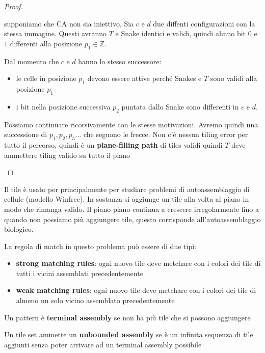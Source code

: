 \begin{teorema}
\begin{proof}
\begin{itemize}
            supponiamo che CA non sia iniettivo, Sia $c$ e $d$
            due diffenti configurazioni con la stessa immagine. Questi 
            avranno $T$ e Snake identici e validi, quindi ahnno bit $0$ e $1$ differenti
            alla posizione $p_1\in \mathbb{Z}$.

            Dal momento che $c$ e $d$ hanno lo stesso successore:
            \begin{itemize}
                \item le celle in posizione $p_1$ devono essere attive perché
                Snakes e $T$ sono validi alla posizione $p_1$
                \item i bit nella posizione successiva $p_2$ puntata dallo Snake
                sono differenti in $c$ e $d$.
            \end{itemize}
            Possiamo continuare ricorsivamente con le stesse motivazioni.
            Avremo quindi una successione di $p_1,p_2,p_3\dots$ che seguono le 
            frecce. Non c'è nessun tiling error per tutto il percorso, quindi 
            è un \textbf{plane-filling path} di tiles validi quindi $T$ deve 
            ammettere tiling valido su tutto il piano
        \end{itemize}
    \end{proof}
\end{teorema}

Il tile è usato per principalmente per studiare problemi di autoassemblaggio di 
cellule (modello Winfree). In sostanza si aggiunge un tile alla volta al piano in modo che rimanga 
valido. Il piano piano continua a crescere irregolarmente fino a quando non possiamo 
più aggiungere tile, questo corrisponde all'autoassemblaggio biologico.

La regola di match in questo problema può essere di due tipi:
\begin{itemize}
    \item \textbf{strong matching rules}: ogni nuovo tile deve metchare con i colori 
    dei tile di tutti i vicini assemblati precedentemente
    \item \textbf{weak matching rules}: ogni nuovo tile deve metchare con i colori 
    dei tile di almeno un solo vicino assemblato precedentemente
\end{itemize}

\begin{definizione} 
    Un pattern è \textbf{terminal assembly} se non ha più tile che si possono aggiungere
\end{definizione}
\begin{definizione} 
    Un tile set ammette un \textbf{unbounded assembly} se è un infinita sequenza 
    di tile aggiunti senza poter arrivare ad un terminal assembly possibile
\end{definizione}

